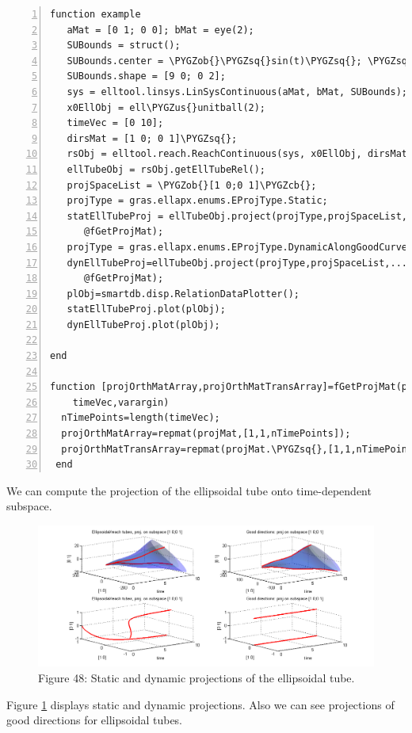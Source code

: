\documentclass[letterpaper,10pt,english]{sphinxmanual}
\def\PYGZus{\char`\_}
\def\PYGZob{\char`\{}
\def\PYGZcb{\char`\}}
\def\PYGZsq{\char`\'}
\begin{document}
\begin{Verbatim}[commandchars=\\\{\},numbers=left,firstnumber=1,stepnumber=1]
function example
   aMat = [0 1; 0 0]; bMat = eye(2);  
   SUBounds = struct();
   SUBounds.center = \PYGZob{}\PYGZsq{}sin(t)\PYGZsq{}; \PYGZsq{}cos(t)\PYGZsq{}\PYGZcb{};  
   SUBounds.shape = [9 0; 0 2]; 
   sys = elltool.linsys.LinSysContinuous(aMat, bMat, SUBounds);
   x0EllObj = ell\PYGZus{}unitball(2);
   timeVec = [0 10]; 
   dirsMat = [1 0; 0 1]\PYGZsq{};  
   rsObj = elltool.reach.ReachContinuous(sys, x0EllObj, dirsMat, timeVec);
   ellTubeObj = rsObj.getEllTubeRel();
   projSpaceList = \PYGZob{}[1 0;0 1]\PYGZcb{};
   projType = gras.ellapx.enums.EProjType.Static;
   statEllTubeProj = ellTubeObj.project(projType,projSpaceList,...
      @fGetProjMat);
   projType = gras.ellapx.enums.EProjType.DynamicAlongGoodCurve;
   dynEllTubeProj=ellTubeObj.project(projType,projSpaceList,...
      @fGetProjMat);
   plObj=smartdb.disp.RelationDataPlotter();
   statEllTubeProj.plot(plObj);
   dynEllTubeProj.plot(plObj);

end

function [projOrthMatArray,projOrthMatTransArray]=fGetProjMat(projMat,...
    timeVec,varargin)
  nTimePoints=length(timeVec);
  projOrthMatArray=repmat(projMat,[1,1,nTimePoints]);
  projOrthMatTransArray=repmat(projMat.\PYGZsq{},[1,1,nTimePoints]);
 end
\end{Verbatim}
\label{chap_implement:goto-label}
We can compute the projection of the ellipsoidal
tube onto time-dependent subspace.
\begin{figure}[htbp]
\centering
\capstart

\includegraphics[width=1.000\linewidth]{chapter05_section03_reachTubeStatProjreachTubeDynProj.png}
\caption{Figure 48: Static and dynamic projections of the ellipsoidal tube.}\label{chap_implement:statdyn-proj}\end{figure}

Figure \hyperref[chap_implement:statdyn-proj]{ \ref*{chap_implement:statdyn-proj}} displays static and dynamic projections.
Also we can see projections of good directions for ellipsoidal tubes.
\end{document}
